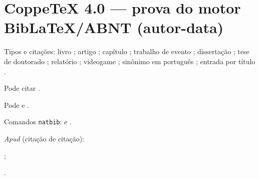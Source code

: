 \documentclass[12pt]{article}
\begin{document}
	
\section*{CoppeTeX 4.0 --- prova do motor BibLaTeX/ABNT (autor-data)}

Tipos e cita\c{c}\~oes: livro \autocite{the1}; artigo \textcite{art1};
cap\'itulo \autocite{inc1}; trabalho de evento \autocite{inp1};
disserta\c{c}\~ao \autocite[p.~10]{the1}; tese de doutorado \autocite{tesedsc};
relat\'orio \autocite{rep1}; videogame \autocite{civ6}; 
sin\^onimo em portugu\^es \autocite{livpt}; entrada por t\'itulo \autocite{misc1}.

Pode citar \cite{rep1}.

Pode \citep[p. 12]{art1} e \citet[p. 15]{livpt}.

Comandos \texttt{natbib}: \citet{art1} e \citep{the1}.

\textit{Apud} (cita\c{c}\~ao de cita\c{c}\~ao):


 ;

.

\printbibliography
\end{document}
